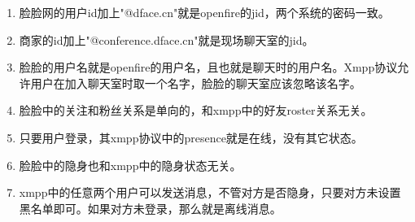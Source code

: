 \documentclass[cs4size]{ctexartutf8}
\begin{document}
\begin{enumerate}
\item 脸脸网的用户id加上"@dface.cn"就是openfire的jid，两个系统的密码一致。
\item 商家的id加上"@conference.dface.cn"就是现场聊天室的jid。
\item 脸脸的用户名就是openfire的用户名，且也就是聊天时的用户名。Xmpp协议允许用户在加入聊天室时取一个名字，脸脸的聊天室应该忽略该名字。
\item 脸脸中的关注和粉丝关系是单向的，和xmpp中的好友roster关系无关。
\item 只要用户登录，其xmpp协议中的presence就是在线，没有其它状态。
\item 脸脸中的隐身也和xmpp中的隐身状态无关。
\item xmpp中的任意两个用户可以发送消息，不管对方是否隐身，只要对方未设置黑名单即可。如果对方未登录，那么就是离线消息。
\end{enumerate}



\newpage
\end{document}
